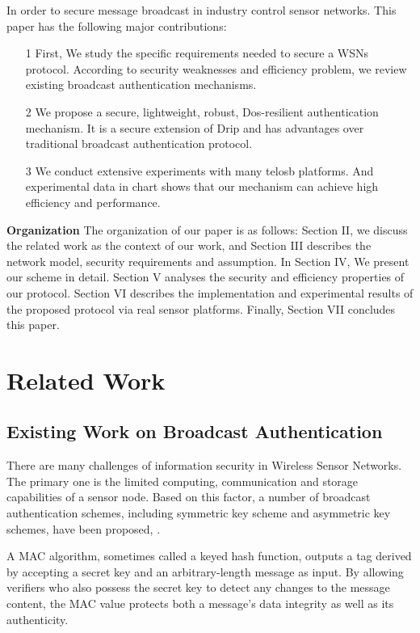 \documentclass{sig-alternate-05-2015}
\begin{document}
In order to secure message broadcast in industry control sensor networks.
This paper has the following major contributions:
\begin{itemize}
\item[1] First, We study the specific requirements needed to secure a WSNs protocol. According to security weaknesses and efficiency problem, we 
review existing broadcast authentication mechanisms.
\item[2] We propose a secure, lightweight, robust, Dos-resilient authentication mechanism. It is a secure extension of Drip and has advantages over traditional broadcast authentication protocol. 
\item[3] We conduct extensive experiments with many telosb platforms. And experimental data in chart shows that our mechanism can achieve high efficiency and performance.
\end{itemize}

\textbf{Organization} The organization of our paper is as follows:  Section II, we discuss the related work as the context of our work, and Section III describes the network model, security requirements and assumption. In Section IV, We present our scheme in detail. Section V analyses the security and efficiency properties of our protocol. Section VI describes the implementation and experimental results of the proposed protocol via real sensor platforms. Finally, Section VII concludes this paper. 

\section{Related Work}
\subsection{Existing Work on Broadcast Authentication}
There are many challenges of information security in Wireless Sensor Networks. The primary one is the limited computing, communication and storage capabilities of a sensor node. Based on this factor, a number of broadcast authentication schemes, including symmetric key scheme and asymmetric key schemes, have been proposed, . 

A MAC algorithm, sometimes called a keyed hash function, outputs a tag derived by accepting a secret key and an arbitrary-length message as input\cite{TinySec}. By allowing verifiers who also possess the secret key to detect any changes to the message content, the MAC value protects both a message's data integrity as well as its authenticity.
\end{document}
